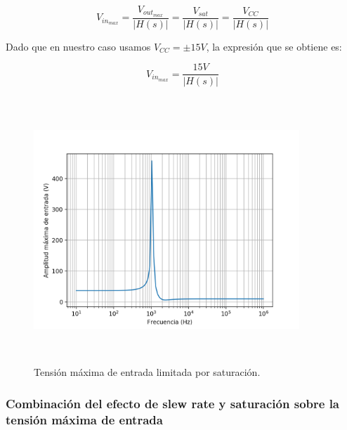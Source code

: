 \begin{equation}
V_{in_{max}} = \frac{V_{out_{max}}}{\rvert H(s) \rvert} = \frac{V_{sat}}{\rvert H(s) \rvert} = \frac{V_{CC}}{\rvert H(s) \rvert}
\end{equation}

Dado que en nuestro caso usamos $V_{CC} = \pm15V$, la expresi\'on que se obtiene es:

\begin{equation}
V_{in_{max}} = \frac{15V}{\rvert H(s) \rvert} 
\end{equation}


\begin{figure}[H] %
	\centering
	\includegraphics[width=10cm,height=10cm,keepaspectratio]{../EJ1/00GRAFICOS/vinmaxsat.png}
	\caption{Tensi\'on m\'axima de entrada limitada por saturaci\'on.}
	\label{vinmaxsat}
\end{figure}

\subsubsection{Combinaci\'on del efecto de slew rate y saturaci\'on sobre la tensi\'on m\'axima de entrada}


